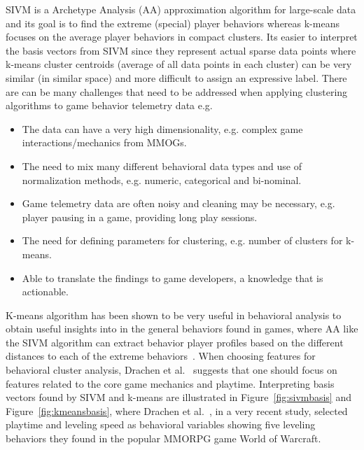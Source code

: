 SIVM is a Archetype Analysis (AA) approximation algorithm for large-scale data and its goal is to find the extreme (special) player behaviors whereas k-means focuses on the average player behaviors in compact clusters. Its easier to interpret the basis vectors from SIVM since they represent actual sparse data points where k-means cluster centroids (average of all data points in each cluster) can be very similar (in similar space) and more difficult to assign an expressive label. There are can be many challenges that need to be addressed when applying clustering algorithms to game behavior telemetry data e.g.
\begin{itemize}
\item The data can have a very high dimensionality, e.g. complex game interactions/mechanics from MMOGs.
\item The need to mix many different behavioral data types and use of normalization methods, e.g. numeric, categorical and bi-nominal.
\item Game telemetry data are often noisy and cleaning may be necessary, e.g. player pausing in a game, providing long play sessions.
\item The need for defining parameters for clustering, e.g. number of clusters for k-means.
\item Able to translate the findings to game developers, a knowledge that is actionable.
\end{itemize}

K-means algorithm has been shown to be very useful in behavioral analysis to obtain useful insights into in the general behaviors found in games, where AA like the SIVM algorithm can extract behavior player profiles based on the different distances to each of the extreme behaviors~\citep{Drachen:2013}. When choosing features for behavioral cluster analysis, Drachen et al.~\citep{Drachen:2009TGA, Drachen:2012} suggests that one should focus on features related to the core game mechanics and playtime. Interpreting basis vectors found by SIVM and k-means are illustrated in Figure~\ref{fig:sivmbasis} and Figure~\ref{fig:kmeansbasis}, where Drachen et al.~\citep{Drachen:2013}, in a very recent study, selected playtime and leveling speed as behavioral variables showing five leveling behaviors they found in the popular MMORPG game World of Warcraft.\\


